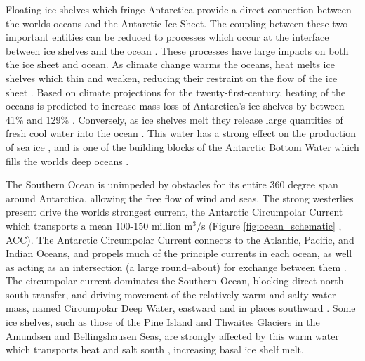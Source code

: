 Floating ice shelves which fringe Antarctica provide a direct connection between the worlds oceans and the Antarctic Ice Sheet. The coupling between these two important entities can be reduced to processes which occur at the interface between ice shelves and the ocean \cite{holland2003modelling}. These processes have large impacts on both the ice sheet and ocean. As climate change warms the oceans, heat melts ice shelves which thin and weaken, reducing their restraint on the flow of the ice sheet \citep{pritchard2012antarctic}. Based on climate projections for the twenty-first-century, heating of the oceans is predicted to increase mass loss of Antarctica's ice shelves by between 41\% and 129\% \citep{naughten2018future}. Conversely, as ice shelves melt they release large quantities of fresh cool water into the ocean \citep[e.g.][]{holland2006effects}. This water has a strong effect on the production of sea ice \citep{langhorne2015observed}, and is one of the building blocks of the Antarctic Bottom Water which fills the worlds deep oceans \citep{foldvik2004ice}.

The Southern Ocean is unimpeded by obstacles for its entire 360 degree span around Antarctica, allowing the free flow of wind and seas. The strong westerlies present drive the worlds strongest current, the Antarctic Circumpolar Current which transports a mean 100-150 million $\mathrm{m}^3$/s \citep{knauss2016introduction} (Figure {\ref{fig:ocean_schematic}
}, ACC). The Antarctic Circumpolar Current connects to the Atlantic, Pacific, and Indian Oceans, and propels much of the principle currents in each ocean, as well as acting as an intersection (a large round--about) for exchange between them \citep{knauss2016introduction}. The circumpolar current dominates the Southern Ocean, blocking direct north--south transfer, and driving movement of the relatively warm and salty water mass, named Circumpolar Deep Water, eastward and in places southward \citep{knauss2016introduction}. Some ice shelves, such as those of the Pine Island and Thwaites Glaciers \citep{nakayama2019pathways} in the Amundsen and Bellingshausen Seas,  are strongly affected by this warm water which transports heat and salt south \citep{nakayama2018origin}, increasing basal ice shelf melt. 

